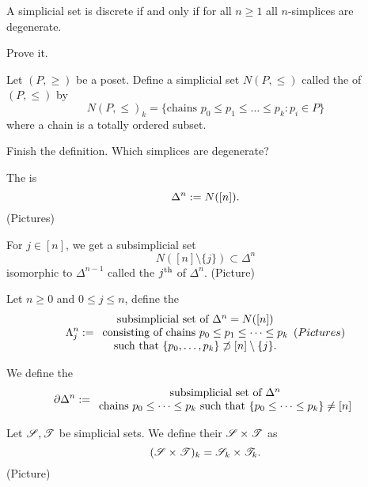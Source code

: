 \begin{lemma}
	A simplicial set is discrete if and only if for all $n\ge 1$ all $n$-simplices are degenerate.
\end{lemma}
\begin{exercise}
	Prove it.
\end{exercise}
\begin{example}
	Let $(P,\ge )$ be a poset. Define a simplicial set $N(P,\le )$ called the  of $(P,\le )$ by
	\[
		N(P,\le )_k = \{\text{chains }p_0\le p_1\le \dots\le p_k: p_i\in P\} 
	\]
	where a chain is a totally ordered subset.
\end{example}
\begin{exercise}
	Finish the definition. Which simplices are degenerate?
\end{exercise}
\begin{example}
	The  is
	\[
		\Delta^{n} := N([n]).
	\] 
	(Pictures)
\end{example}
\begin{note}
	For $j\in [n]$, we get a subsimplicial set
	\[
		N([n]\setminus \{j\} ) \subset \Delta^{n}
	\] 
	isomorphic to $\Delta^{n-1}$ called the $j^\text{th}$  of $\Delta^{n}$. (Picture)
\end{note}
\begin{example}[Horns]
	Let $n\ge 0$ and $0\le j\le n$, define the 
	\[
		\Lambda^{n}_j := \begin{array}{c}
			\text{subsimplicial set of }\Delta^{n} = N([n]) \\
			\text{consisting of chains }p_0\le p_1\le \dots\le p_k \\
			\text{such that } \{p_0,\dots,p_k\} \not\supset [n] \setminus \{j\} . 
		\end{array}
		(Pictures)
	\] 
\end{example}
\begin{example}
	We define the 
	\[
		\partial \Delta^{n} := \begin{array}{c}
			\text{subsimplicial set of }\Delta^{n} \\
			\text{chains }p_0\le \dots \le p_k\text{ such that }\{p_0\le \dots\le p_k\} \neq [n]
		\end{array}
	\] 
\end{example}
\begin{example}[Products]
	Let $\mathscr S,\mathscr T$ be simplicial sets. We define their  $\mathscr S\times \mathscr T$ as
	\[
		(\mathscr S\times \mathscr T)_k = \mathscr S_k \times \mathscr T_k.
	\] 
	(Picture)
\end{example}
